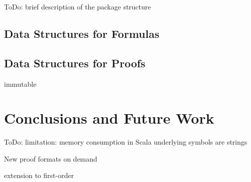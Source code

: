 \documentclass{llncs}
\begin{document}
ToDo: brief description of the package structure


\subsection{Data Structures for Formulas}


\subsection{Data Structures for Proofs}

immutable


\section{Conclusions and Future Work}

ToDo: limitation: memory consumption in Scala
underlying symbols are strings

New proof formats on demand

extension to first-order




\end{document}
